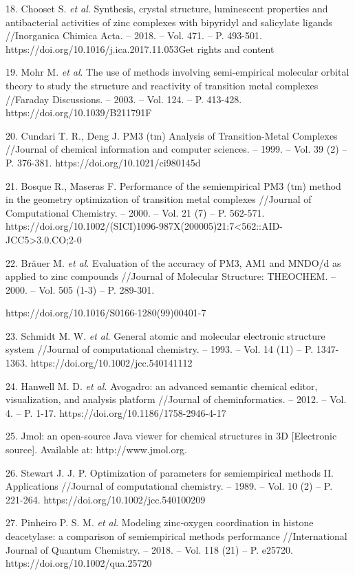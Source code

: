 \begin{noparindent}
18.
  Chooset S. \emph{et al}. Synthesis, crystal structure, luminescent
  properties and antibacterial activities of zinc complexes with
  bipyridyl and salicylate ligands //Inorganica Chimica Acta. -- 2018.
  -- Vol. 471. -- P. 493-501.
  https://doi.org/10.1016/j.ica.2017.11.053Get rights and content

19.
  Mohr M. \emph{et al}. The use of methods involving semi-empirical
  molecular orbital theory to study the structure and reactivity of
  transition metal complexes //Faraday Discussions. -- 2003. -- Vol.
  124. -- P. 413-428. https://doi.org/10.1039/B211791F

20.
  Cundari T. R., Deng J. PM3 (tm) Analysis of Transition-Metal Complexes
  //Journal of chemical information and computer sciences. -- 1999. --
  Vol. 39 (2) -- P. 376-381. https://doi.org/10.1021/ci980145d

21.
  Bosque R., Maseras F. Performance of the semiempirical PM3 (tm) method
  in the geometry optimization of transition metal complexes //Journal
  of Computational Chemistry. -- 2000. -- Vol. 21 (7) -- P. 562-571.
  https://doi.org/10.1002/(SICI)1096-987X(200005)21:7\textless562::AID-JCC5\textgreater3.0.CO;2-0

22.
  Bräuer M. \emph{et al}. Evaluation of the accuracy of PM3, AM1 and
  MNDO/d as applied to zinc compounds //Journal of Molecular Structure:
  THEOCHEM. -- 2000. -- Vol. 505 (1-3) -- P. 289-301.

  https://doi.org/10.1016/S0166-1280(99)00401-7

23.
  Schmidt M. W. \emph{et al}. General atomic and molecular electronic
  structure system //Journal of computational chemistry. -- 1993. --
  Vol. 14 (11) -- P. 1347-1363. https://doi.org/10.1002/jcc.540141112

24.
  Hanwell M. D. \emph{et al.} Avogadro: an advanced semantic chemical
  editor, visualization, and analysis platform //Journal of
  cheminformatics. -- 2012. -- Vol. 4. -- P. 1-17.
  https://doi.org/10.1186/1758-2946-4-17

25.
  Jmol: an open-source Java viewer for chemical structures in 3D
  {[}Electronic source{]}. Available at: http://www.jmol.org.

26.
  Stewart J. J. P. Optimization of parameters for semiempirical methods
  II. Applications //Journal of computational chemistry. -- 1989. --
  Vol. 10 (2) -- P. 221-264. https://doi.org/10.1002/jcc.540100209

27.
  Pinheiro P. S. M. \emph{et al}. Modeling zinc‐oxygen coordination in
  histone deacetylase: a comparison of semiempirical methods performance
  //International Journal of Quantum Chemistry. -- 2018. -- Vol. 118
  (21) -- P. e25720. https://doi.org/10.1002/qua.25720


\end{noparindent}
